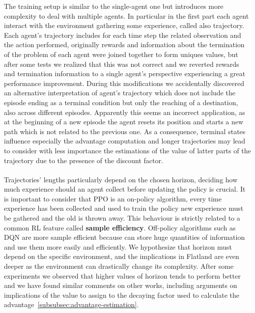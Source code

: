 \documentclass[11pt, a4paper, hidelinks]{report}
\begin{document}
The training setup is similar to the single-agent one but introduces more complexity to deal with multiple agents.
In particular in the first part each agent interact with the environment gathering some experience, called also trajectory.
Each agent's trajectory includes for each time step the related observation and the action performed, originally rewards and information about the termination of the problem of each agent were joined together to form uniques values, but after some tests we realized that this was not correct and we reverted rewards and termination information to a single agent's perspective experiencing a great performance improvement.
During this modifications we accidentally discovered an alternative interpretation of agent's trajectory which does not include the episode ending as a terminal condition but only the reaching of a destination, also across different episodes.
Apparently this seems an incorrect application, as at the beginning of a new episode the agent resets its position and starts a new path which is not related to the previous one.
As a consequence, terminal states influence especially the advantage computation and longer trajectories may lead to consider with less importance the estimations of the value of latter parts of the trajectory due to the presence of the discount factor.%
\\
\\
Trajectories' lengths particularly depend on the chosen horizon, deciding how much experience should an agent collect before updating the policy is crucial.
It is important to consider that PPO is an on-policy algorithm, every time experience has been collected and used to train the policy new experience must be gathered and the old is thrown away.
This behaviour is strictly related to a common RL feature called \textbf{sample efficiency}.
Off-policy algorithms such as DQN are more sample efficient because can store huge quantities of information and use them more easily and efficiently.
We hypothesize that horizon must depend on the specific environment, and the implications in Flatland are even deeper as the environment can drastically change its complexity. %
After some experiments we observed that higher values of horizon tends to perform better and we have found similar comments on other works, including arguments on implications of the value to assign to the decaying factor used to calculate the advantage~\ref{subsubsec:advantage-estimation}.\\
\end{document}
